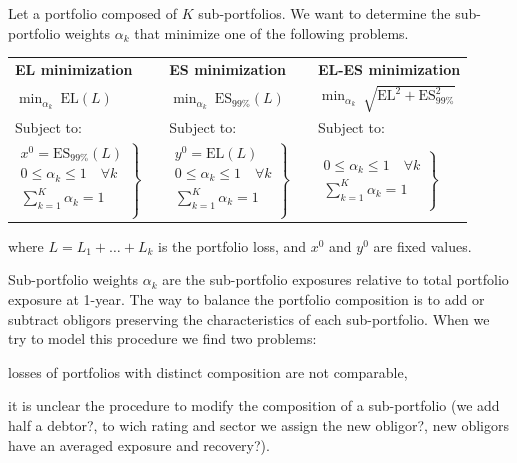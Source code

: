 \documentclass[11pt,fleqn]{book} %
\begin{document}
\begin{definition}
	Let a portfolio composed of $K$ sub-portfolios. We want to determine the 
	sub-portfolio weights $\alpha_k$ that minimize one of the following 
	problems\footnotemark[1].

	{\centering
	\renewcommand{\arraystretch}{1.5}
	\begin{tabular}{l m{1cm} l m{1cm} l}
		\textbf{EL minimization} & & \textbf{ES minimization} & & \textbf{EL-ES minimization} 
		\\
		$\displaystyle \min_{\alpha_k} \ \text{EL}(L)$
		& &
		$\displaystyle \min_{\alpha_k} \ \text{ES}_{99\%}(L)$
		& &
		$\displaystyle \min_{\alpha_k} \ \sqrt{\text{EL}^2+\text{ES}_{99\%}^2}$
		\\
		Subject to:
		& &
		Subject to:
		& &
		Subject to:
		\\
		$\left.
			\begin{array}{l}
				x^0 = \text{ES}_{99\%}(L) \\
				0 \le \alpha_k \le 1 \quad \forall k \\
				\displaystyle \sum_{k=1}^{K} \alpha_k = 1 \\
			\end{array}
			\right\}
		$
		& &
		$\left.
			\begin{array}{l}
				y^0 = \text{EL}(L) \\
				0 \le \alpha_k \le 1 \quad \forall k \\
				\displaystyle \sum_{k=1}^{K} \alpha_k = 1 \\
			\end{array}
			\right\}
		$
		& &
		$\left.
			\begin{array}{l}
				\\
				0 \le \alpha_k \le 1 \quad \forall k \\
				\displaystyle \sum_{k=1}^{K} \alpha_k = 1 \\
			\end{array}
			\right\}
		$
	\end{tabular}\par}
	where $L=L_1+\dots+L_k$ is the portfolio loss, and $x^0$ and $y^0$ are 
	fixed values.
\end{definition}


Sub-portfolio weights $\alpha_k$ are the sub-portfolio exposures relative 
to total portfolio exposure at 1-year. The way to balance the portfolio 
composition is to add or subtract obligors preserving the characteristics 
of each sub-portfolio. When we try to model this procedure we find two 
problems:
\begin{inparaenum}[1)]
	\item losses of portfolios with distinct composition are not comparable, 
	\item it is unclear the procedure to modify the composition of a 
		sub-portfolio (we add half a debtor?, to wich rating and sector we 
		assign the new obligor?, new obligors have an averaged exposure and 
		recovery?).
\end{inparaenum}
\end{document}
